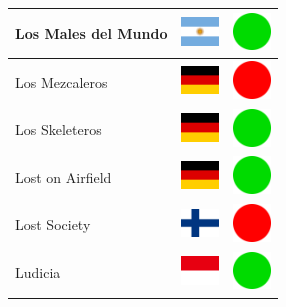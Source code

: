 \documentclass[12pt, a4paper, twoside]{report}
\begin{document}
\begin{center}
\begin{longtable}{|p{5cm}|p{2cm}|p{2cm}|}
 Los Males del Mundo                                        & \includegraphics[width=1cm]{../img/flags/ar} &   \includegraphics[width=1cm]{../likes/y} \\ \hline
 Los Mezcaleros                                             & \includegraphics[width=1cm]{../img/flags/de} &   \includegraphics[width=1cm]{../likes/n} \\ \hline
 Los Skeleteros                                             & \includegraphics[width=1cm]{../img/flags/de} &   \includegraphics[width=1cm]{../likes/y} \\ \hline
 Lost on Airfield                                           & \includegraphics[width=1cm]{../img/flags/de} &   \includegraphics[width=1cm]{../likes/y} \\ \hline
 Lost Society                                               & \includegraphics[width=1cm]{../img/flags/fi} &   \includegraphics[width=1cm]{../likes/n} \\ \hline
 Ludicia                                                    & \includegraphics[width=1cm]{../img/flags/id} &   \includegraphics[width=1cm]{../likes/y} \\ \hline

\end{longtable}
\end{center}
\end{document}

